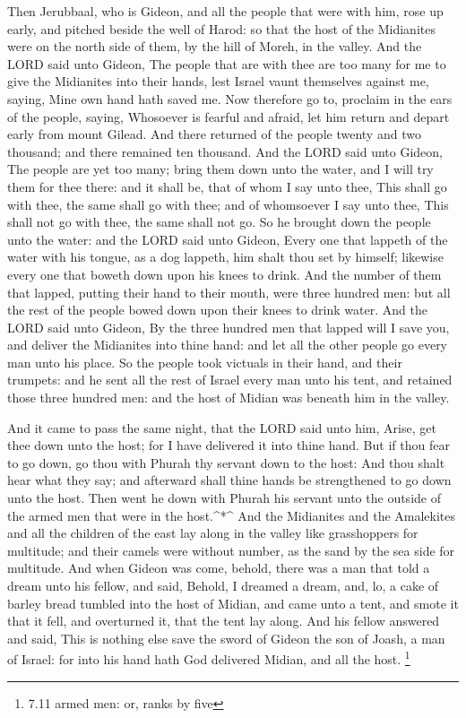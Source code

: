  Then Jerubbaal, who is Gideon, and all the people that were
with him, rose up early, and pitched beside the well of Harod: so that
the host of the Midianites were on the north side of them, by the hill
of Moreh, in the valley.  And the LORD said unto Gideon, The
people that are with thee are too many for me to give the Midianites
into their hands, lest Israel vaunt themselves against me, saying, Mine
own hand hath saved me.  Now therefore go to, proclaim in
the ears of the people, saying, Whosoever is fearful and afraid, let him
return and depart early from mount Gilead. And there returned of the
people twenty and two thousand; and there remained ten thousand.
 And the LORD said unto Gideon, The people are yet too many;
bring them down unto the water, and I will try them for thee there: and
it shall be, that of whom I say unto thee, This shall go with thee, the
same shall go with thee; and of whomsoever I say unto thee, This shall
not go with thee, the same shall not go.  So he brought down
the people unto the water: and the LORD said unto Gideon, Every one that
lappeth of the water with his tongue, as a dog lappeth, him shalt thou
set by himself; likewise every one that boweth down upon his knees to
drink.  And the number of them that lapped, putting their
hand to their mouth, were three hundred men: but all the rest of the
people bowed down upon their knees to drink water.  And the
LORD said unto Gideon, By the three hundred men that lapped will I save
you, and deliver the Midianites into thine hand: and let all the other
people go every man unto his place.  So the people took
victuals in their hand, and their trumpets: and he sent all the rest of
Israel every man unto his tent, and retained those three hundred men:
and the host of Midian was beneath him in the valley.

 And it came to pass the same night, that the LORD said unto
him, Arise, get thee down unto the host; for I have delivered it into
thine hand.  But if thou fear to go down, go thou with
Phurah thy servant down to the host:  And thou shalt hear
what they say; and afterward shall thine hands be strengthened to go
down unto the host. Then went he down with Phurah his servant unto the
outside of the armed men that were in the host.\^{}*\^{} 
And the Midianites and the Amalekites and all the children of the east
lay along in the valley like grasshoppers for multitude; and their
camels were without number, as the sand by the sea side for multitude.
 And when Gideon was come, behold, there was a man that
told a dream unto his fellow, and said, Behold, I dreamed a dream, and,
lo, a cake of barley bread tumbled into the host of Midian, and came
unto a tent, and smote it that it fell, and overturned it, that the tent
lay along.  And his fellow answered and said, This is
nothing else save the sword of Gideon the son of Joash, a man of Israel:
for into his hand hath God delivered Midian, and all the host.
\footnote{7.11 armed men: or, ranks by five}

